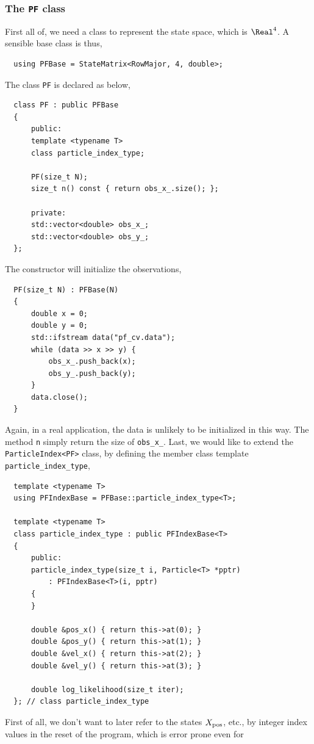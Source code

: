 \subsubsection{The \texttt{PF} class}

First all of, we need a class to represent the state space, which is $\Real^4$.
A sensible base class is thus,
\begin{Verbatim}
  using PFBase = StateMatrix<RowMajor, 4, double>;
\end{Verbatim}
The class \verb|PF| is declared as below,
\begin{Verbatim}
  class PF : public PFBase
  {
      public:
      template <typename T>
      class particle_index_type;

      PF(size_t N);
      size_t n() const { return obs_x_.size(); };

      private:
      std::vector<double> obs_x_;
      std::vector<double> obs_y_;
  };
\end{Verbatim}
The constructor will initialize the observations,
\begin{Verbatim}
  PF(size_t N) : PFBase(N)
  {
      double x = 0;
      double y = 0;
      std::ifstream data("pf_cv.data");
      while (data >> x >> y) {
          obs_x_.push_back(x);
          obs_y_.push_back(y);
      }
      data.close();
  }
\end{Verbatim}
Again, in a real application, the data is unlikely to be initialized in this
way. The method \verb|n| simply return the size of \verb|obs_x_|. Last, we
would like to extend the \verb|ParticleIndex<PF>| class, by defining the member
class template \verb|particle_index_type|,
\begin{Verbatim}
  template <typename T>
  using PFIndexBase = PFBase::particle_index_type<T>;

  template <typename T>
  class particle_index_type : public PFIndexBase<T>
  {
      public:
      particle_index_type(size_t i, Particle<T> *pptr)
          : PFIndexBase<T>(i, pptr)
      {
      }

      double &pos_x() { return this->at(0); }
      double &pos_y() { return this->at(1); }
      double &vel_x() { return this->at(2); }
      double &vel_y() { return this->at(3); }

      double log_likelihood(size_t iter);
  }; // class particle_index_type
\end{Verbatim}
First of all, we don't want to later refer to the states $X_{\mathrm{pos}}$, etc., by
integer index values in the reset of the program, which is error prone even for
